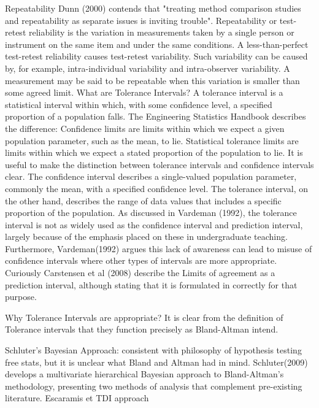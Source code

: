 Repeatability
Dunn (2000) contends that "treating method comparison studies and repeatability as separate issues is inviting trouble".
Repeatability or test-retest reliability is the variation in measurements taken by a single person or instrument on the same item and under the same conditions. 
A less-than-perfect test-retest reliability causes test-retest variability. Such variability can be caused by, for example, intra-individual variability and intra-observer variability. 
A measurement may be said to be repeatable when this variation is smaller than some agreed limit.
What are Tolerance Intervals?
A tolerance interval is a statistical interval within which, with some confidence level, a specified proportion of a population falls.
The Engineering Statistics Handbook describes the difference: Confidence limits are limits within which we expect a given population parameter, such as the mean, to lie. Statistical tolerance limits are limits within which we expect a stated proportion of the population to lie.
It is useful to make the distinction between tolerance intervals and confidence intervals clear. The confidence interval describes a single-valued population parameter, commonly the mean, with a specified confidence level. The tolerance interval, on the other hand, describes the range of data values that includes a specific proportion of the population.
As discussed in Vardeman (1992), the tolerance interval is not as widely used as the confidence interval and prediction interval, largely because of the emphasis placed on these in undergraduate teaching. Furthermore, Vardeman(1992) argues this lack of awareness can lead to misuse of confidence intervals where other types of intervals are more appropriate.
Curiously Carstensen et al (2008) describe the Limits of agreement as a prediction interval, although stating that it is formulated in correctly for that purpose.

Why Tolerance Intervals are appropriate?
It is clear from the definition of Tolerance intervals that they function precisely as Bland-Altman intend.

Schluter’s Bayesian Approach: 
consistent with philosophy of hypothesis testing free stats, but it is unclear what Bland and Altman had in mind.
Schluter(2009) develops a multivariate hierarchical Bayesian approach to Bland-Altman’s methodology, presenting two methods of analysis that complement pre-existing literature.
Escaramis et TDI approach

